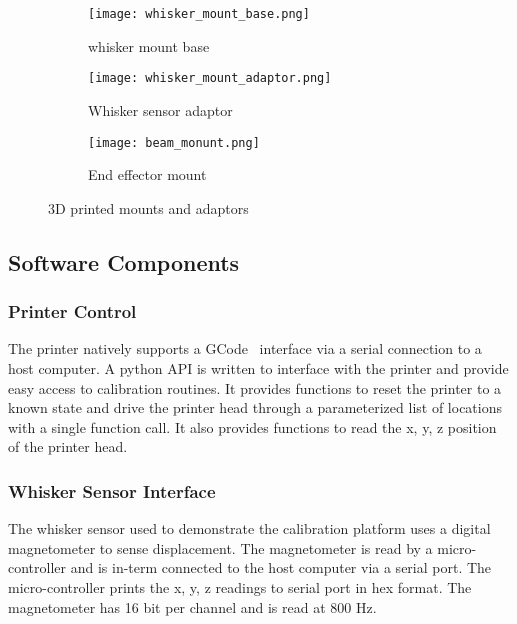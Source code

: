 \documentclass[runningheads]{llncs}
\begin{document}
\begin{figure}
    \begin{subfigure}{.32\textwidth}
    \centering
    \texttt{[image: whisker\_mount\_base.png]}
        \caption{whisker mount base}
        \label{fig:whisker_mount_base}
    \end{subfigure}
    \begin{subfigure}{.32\textwidth}
        \centering
        \texttt{[image: whisker\_mount\_adaptor.png]}
        \caption{Whisker sensor adaptor}
        \label{fig:whisker_mount_adaptor}
    \end{subfigure}
    \begin{subfigure}{.32\textwidth}
        \centering
        \texttt{[image: beam\_monunt.png]}
        \caption{End effector mount}
        \label{fig:beam_monunt}
    \end{subfigure}
    \caption{3D printed mounts and adaptors}
    \label{fig:calibration_rig}
\end{figure}

\subsection{Software Components}

\subsubsection{Printer Control}

The printer natively supports a GCode~\cite{kramerNISTRS274NGCInterpreter2000} interface via a serial connection to a host computer. A python API is written to interface with the printer and provide easy access to calibration routines. It provides functions to reset the printer to a known state and drive the printer head through a parameterized list of locations with a single function call. It also provides functions to read the x, y, z position of the printer head.

\subsubsection{Whisker Sensor Interface}

The whisker sensor used to demonstrate the calibration platform uses a digital magnetometer to sense displacement. The magnetometer is read by a micro-controller and is in-term connected to the host computer via a serial port. The micro-controller prints the x, y, z readings to serial port in hex format. The magnetometer has 16 bit per channel and is read at 800 Hz.
\end{document}
